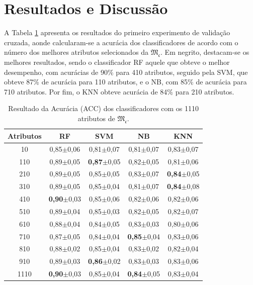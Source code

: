 \documentclass[a4paper]{ifacconf}
\begin{document}
\section{Resultados e Discussão}



A Tabela \ref{tab:02} apresenta os resultados do  primeiro experimento de validação cruzada, aonde calcularam-se a acurácia dos classificadores de acordo com o número dos melhores atributos selecionados da $\mathfrak{M_c}$. Em negrito, destacam-se os melhores resultados, sendo o classificador RF aquele que obteve o melhor desempenho, com acurácias de 90\% para 410 atributos, seguido pela SVM, que obteve 87\% de acurácia para 110 atributos, e o NB, com 85\% de acurácia para 710 atributos. Por fim, o KNN obteve acurácia de 84\% para 210 atributos.

\begin{table}[h]	
	\centering
	\caption{Resultado da Acurácia (ACC) dos classificadores com os 1110 atributos de $\mathfrak{M_c}$.}\label{tab:02}
		\begin{tabular}{ccccc}
			    \hline \textbf{Atributos} & \textbf{RF} & \textbf{SVM} & \textbf{NB} & \textbf{KNN}\\ \hline
			 10 & 0,85$\pm$0,06 & 0,81$\pm$0,07 & 0,81$\pm$0,07 & 0,83$\pm$0,07 \\
			 110 & 0,89$\pm$0,05 & \textbf{0,87}$\pm$0,05 & 0,82$\pm$0,05 & 0,81$\pm$0,06 \\
			 210 & 0,89$\pm$0,05 & 0,85$\pm$0,05 & 0,83$\pm$0,07 & \textbf{0,84}$\pm$0,05 \\
			 310 & 0,89$\pm$0,05 & 0,85$\pm$0,04 & 0,81$\pm$0,07 & \textbf{0,84}$\pm$0,08 \\
			 410 & \textbf{0,90}$\pm$0,03 & 0,85$\pm$0,06 & 0,82$\pm$0,06 & 0,82$\pm$0,06 \\
			 510 & 0,89$\pm$0,04 & 0,85$\pm$0,03 & 0,82$\pm$0,05 & 0,82$\pm$0,07 \\
			 610 & 0,88$\pm$0,04 & 0,84$\pm$0,05 & 0,83$\pm$0,03 & 0,80$\pm$0,06 \\
			 710 & 0,87$\pm$0,05 & 0,84$\pm$0,04 & \textbf{0,85}$\pm$0,04 & 0,83$\pm$0,06 \\
			 810 & 0,88$\pm$0,02 & 0,85$\pm$0,04 & 0,83$\pm$0,02 & 0,82$\pm$0,04 \\
			 910 & 0,89$\pm$0,03 & \textbf{0,86}$\pm$0,02 & 0,83$\pm$0,03 & 0,83$\pm$0,06 \\
			 1110 & \textbf{0,90}$\pm$0,03 & 0,85$\pm$0,04 & \textbf{0,84}$\pm$0,05 & 0,83$\pm$0,04 \\
			\hline
		\end{tabular}
\end{table}
\end{document}
